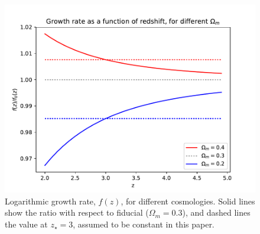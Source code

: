 \begin{figure}[h]
 \begin{center}
  \includegraphics[scale=0.7]{figures/fz_omega_m}
 \end{center}
 \caption{Logarithmic growth rate, $f(z)$, for different cosmologies.
  Solid lines show the ratio with respect to fiducial ($\Omega_m=0.3$), 
  and dashed lines the value at $z_\star=3$, assumed to be constant in this 
  paper.}
 \label{fig:fz_Om}
\end{figure}

